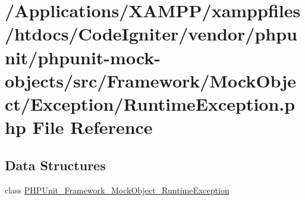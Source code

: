 \hypertarget{phpunit_2phpunit-mock-objects_2src_2_framework_2_mock_object_2_exception_2_runtime_exception_8php}{}\section{/\+Applications/\+X\+A\+M\+P\+P/xamppfiles/htdocs/\+Code\+Igniter/vendor/phpunit/phpunit-\/mock-\/objects/src/\+Framework/\+Mock\+Object/\+Exception/\+Runtime\+Exception.php File Reference}
\label{phpunit_2phpunit-mock-objects_2src_2_framework_2_mock_object_2_exception_2_runtime_exception_8php}
\subsection*{Data Structures}
\begin{DoxyCompactItemize}
\item 
class \mbox{\hyperlink{class_p_h_p_unit___framework___mock_object___runtime_exception}{P\+H\+P\+Unit\+\_\+\+Framework\+\_\+\+Mock\+Object\+\_\+\+Runtime\+Exception}}
\end{DoxyCompactItemize}
